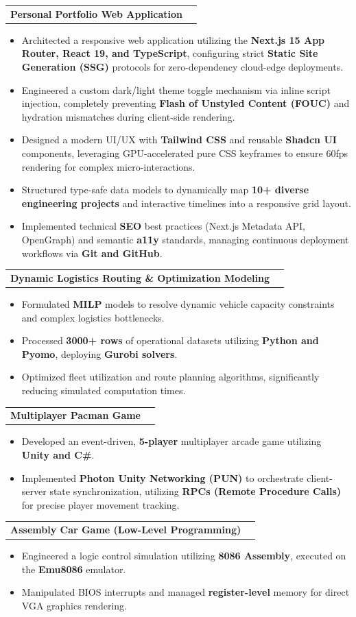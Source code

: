 \documentclass[letterpaper,11pt]{article}
\newcommand{\resumeItem}[1]{
  \item\small{
    {#1 \vspace{-4pt}}
  }
}
\newcommand{\resumeProjectHeading}[2]{
    \item
    \begin{tabularx}{0.97\textwidth}{X r}
      \textbf{#1} & #2 \\
    \end{tabularx}\vspace{-5pt}
}
\newcommand{\resumeItemListStart}{\begin{itemize}}
\newcommand{\resumeItemListEnd}{\end{itemize}\vspace{-5pt}}
\begin{document}
          \resumeProjectHeading
          {\textbf{Personal Portfolio Web Application} }{}
          \resumeItemListStart
            \resumeItem{Architected a responsive web application utilizing the \textbf{Next.js 15 App Router, React 19, and TypeScript}, configuring strict \textbf{Static Site Generation (SSG)} protocols for zero-dependency cloud-edge deployments.}
            \resumeItem{Engineered a custom dark/light theme toggle mechanism via inline script injection, completely preventing \textbf{Flash of Unstyled Content (FOUC)} and hydration mismatches during client-side rendering.}
            \resumeItem{Designed a modern UI/UX with \textbf{Tailwind CSS} and reusable \textbf{Shadcn UI} components, leveraging GPU-accelerated pure CSS keyframes to ensure 60fps rendering for complex micro-interactions.}
            \resumeItem{Structured type-safe data models to dynamically map \textbf{10+ diverse engineering projects} and interactive timelines into a responsive grid layout.}
            \resumeItem{Implemented technical \textbf{SEO} best practices (Next.js Metadata API, OpenGraph) and semantic \textbf{a11y} standards, managing continuous deployment workflows via \textbf{Git and GitHub}.}
          \resumeItemListEnd

      \resumeProjectHeading
          {\textbf{Dynamic Logistics Routing \& Optimization Modeling} }{}
          \resumeItemListStart
            \resumeItem{Formulated \textbf{MILP} models to resolve dynamic vehicle capacity constraints and complex logistics bottlenecks.}
            \resumeItem{Processed \textbf{3000+ rows} of operational datasets utilizing \textbf{Python and Pyomo}, deploying \textbf{Gurobi solvers}.}
            \resumeItem{Optimized fleet utilization and route planning algorithms, significantly reducing simulated computation times.}
          \resumeItemListEnd

      \resumeProjectHeading
          {\textbf{Multiplayer Pacman Game } }{}
          \resumeItemListStart
            \resumeItem{Developed an event-driven, \textbf{5-player} multiplayer arcade game utilizing \textbf{Unity and C\#}.}
            \resumeItem{Implemented \textbf{Photon Unity Networking (PUN)} to orchestrate client-server state synchronization, utilizing \textbf{RPCs (Remote Procedure Calls)} for precise player movement tracking.}
          \resumeItemListEnd

      \resumeProjectHeading
          {\textbf{Assembly Car Game (Low-Level Programming)} }{}
          \resumeItemListStart
            \resumeItem{Engineered a logic control simulation utilizing \textbf{8086 Assembly}, executed on the \textbf{Emu8086} emulator.}
            \resumeItem{Manipulated BIOS interrupts and managed \textbf{register-level} memory for direct VGA graphics rendering.}
          \resumeItemListEnd
\end{document}
